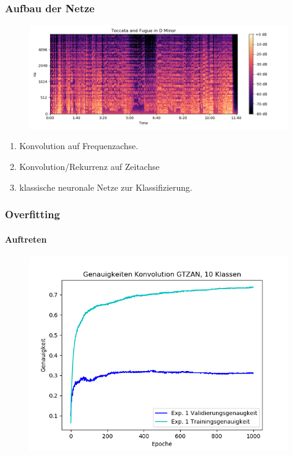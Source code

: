 \documentclass{beamer}
\begin{document}
\frame
{
	\frametitle{Aufbau der Netze}
	\begin{figure}[h!]
		\centering
		\includegraphics[width=0.7\linewidth,height=0.7\textheight, keepaspectratio]{res/old/tocattaandfuguemelspectogram.png}
	\end{figure}
	\begin{enumerate}
	\item Konvolution auf Frequenzachse.
	\item Konvolution/Rekurrenz auf Zeitachse
	\item klassische neuronale Netze zur Klassifizierung.
	\end{enumerate}
	
}



\frame
{
	\frametitle{Overfitting}
	\framesubtitle{Auftreten}
	\begin{figure}[h!]
		\centering
		\includegraphics[width=0.7\linewidth,height=0.7\textheight, keepaspectratio]{res/old/ex1.png}
	\end{figure}
}
\end{document}
